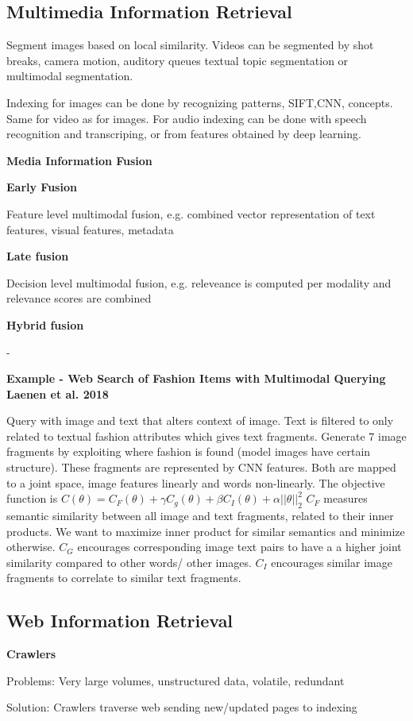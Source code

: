 \documentclass[a4paper,10pt,landscape]{article}
\newcommand{\topic}[1]{\begin{center}\section*{#1}\end{center}}
\begin{document}
\begin{multicols}{3}
\begin{center}
\topic{Multimedia Information Retrieval}

Segment images based on local similarity. Videos can be segmented by shot breaks, camera motion, auditory queues textual topic segmentation or multimodal segmentation.

Indexing for images can be done by recognizing patterns, SIFT,CNN, concepts. Same for video as for images.
For audio indexing can be done with speech recognition and transcriping, or from features obtained by deep learning.

{\Large \textbf{Media Information Fusion} \par}
\end{center}

\textbf{Early Fusion}

Feature level multimodal fusion, e.g. combined vector representation of text features, visual features, metadata

\textbf{Late fusion}

Decision level multimodal fusion, e.g. releveance is computed per modality and relevance scores are combined

\textbf{Hybrid fusion}

-

\textbf{Example - Web Search of Fashion Items with Multimodal Querying Laenen et al. 2018}

Query with image and text that alters context of image.
Text is filtered to only related to textual fashion attributes which gives text fragments.
Generate 7 image fragments by exploiting where fashion is found (model images have certain structure). These fragments are represented by CNN features.
Both are mapped to a joint space, image features linearly and words non-linearly.
The objective function is
$C(\theta) = C_F(\theta)+\gamma C_g(\theta)+\beta C_I(\theta)+\alpha ||\theta||_2^2$
$C_F$ measures semantic similarity between all image and text fragments, related to their inner products. We want to maximize inner product for similar semantics and minimize otherwise.
$C_G$ encourages corresponding image text pairs to have a a higher joint similarity compared to other words/ other images.
$C_I$ encourages similar image fragments to correlate to similar text fragments.

\topic{Web Information Retrieval}

\textbf{Crawlers}

Problems: Very large volumes, unstructured data, volatile, redundant

Solution: Crawlers traverse web sending new/updated pages to indexing


\end{multicols}
\end{document}
